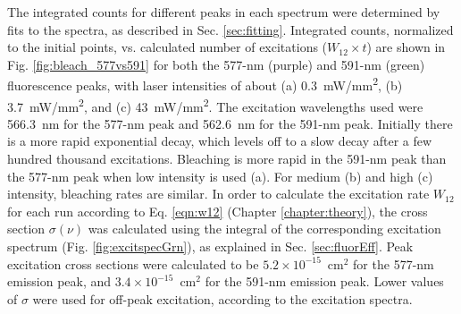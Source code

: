 The integrated counts for different peaks in each spectrum were determined by fits to the spectra, as described in Sec. \ref{sec:fitting}.  Integrated counts, normalized to the initial points, vs. calculated number of excitations ($W_{12} \times t$) are shown in Fig. \ref{fig:bleach_577vs591} for both the 577-nm (purple) and 591-nm (green) fluorescence peaks, with laser intensities of about (a) 0.3~mW/mm\textsuperscript{2}, (b) 3.7~mW/mm\textsuperscript{2}, and (c) 43~mW/mm\textsuperscript{2}.  The excitation wavelengths used were 566.3~nm for the 577-nm peak and 562.6~nm for the 591-nm peak.  Initially there is a more rapid exponential decay, which levels off to a slow decay after a few hundred thousand excitations.  Bleaching is more rapid in the 591-nm peak than the 577-nm peak when low intensity is used (a).  For medium (b) and high (c) intensity, bleaching rates are similar.  In order to calculate the excitation rate $W_{12}$ for each run according to Eq. \ref{eqn:w12} (Chapter \ref{chapter:theory}), the cross section $\sigma(\nu)$ was calculated using the integral of the corresponding excitation spectrum (Fig. \ref{fig:excitspecGrn}), as explained in Sec. \ref{sec:fluorEff}.  Peak excitation cross sections were calculated to be $5.2 \times 10^{-15}$~cm$^{2}$ for the 577-nm emission peak, and $3.4 \times 10^{-15}$~cm$^{2}$ for the 591-nm emission peak.  Lower values of $\sigma$ were used for off-peak excitation, according to the excitation spectra.

